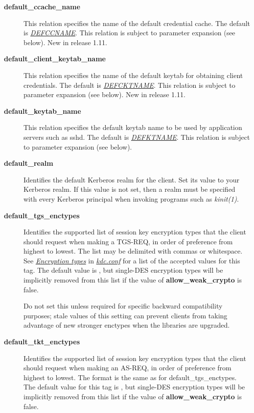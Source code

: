 \documentclass[letterpaper,10pt,english]{sphinxmanual}
\begin{document}
\begin{description}
\item[{\textbf{default\_ccache\_name}}] \leavevmode
This relation specifies the name of the default credential cache.
The default is {\hyperref[mitK5defaults:paths]{\emph{DEFCCNAME}}}.  This relation is subject to parameter
expansion (see below).  New in release 1.11.

\item[{\textbf{default\_client\_keytab\_name}}] \leavevmode
This relation specifies the name of the default keytab for
obtaining client credentials.  The default is {\hyperref[mitK5defaults:paths]{\emph{DEFCKTNAME}}}.  This
relation is subject to parameter expansion (see below).
New in release 1.11.

\item[{\textbf{default\_keytab\_name}}] \leavevmode
This relation specifies the default keytab name to be used by
application servers such as sshd.  The default is {\hyperref[mitK5defaults:paths]{\emph{DEFKTNAME}}}.  This
relation is subject to parameter expansion (see below).

\item[{\textbf{default\_realm}}] \leavevmode
Identifies the default Kerberos realm for the client.  Set its
value to your Kerberos realm.  If this value is not set, then a
realm must be specified with every Kerberos principal when
invoking programs such as \emph{kinit(1)}.

\item[{\textbf{default\_tgs\_enctypes}}] \leavevmode
Identifies the supported list of session key encryption types that
the client should request when making a TGS-REQ, in order of
preference from highest to lowest.  The list may be delimited with
commas or whitespace.  See {\hyperref[admin/conf_files/kdc_conf:encryption-types]{\emph{Encryption types}}} in
{\hyperref[admin/conf_files/kdc_conf:kdc-conf-5]{\emph{kdc.conf}}} for a list of the accepted values for this tag.
The default value is , but single-DES encryption types
will be implicitly removed from this list if the value of
\textbf{allow\_weak\_crypto} is false.

Do not set this unless required for specific backward
compatibility purposes; stale values of this setting can prevent
clients from taking advantage of new stronger enctypes when the
libraries are upgraded.

\item[{\textbf{default\_tkt\_enctypes}}] \leavevmode
Identifies the supported list of session key encryption types that
the client should request when making an AS-REQ, in order of
preference from highest to lowest.  The format is the same as for
default\_tgs\_enctypes.  The default value for this tag is
, but single-DES encryption types will be implicitly
removed from this list if the value of \textbf{allow\_weak\_crypto} is
false.


\end{description}
\end{document}
